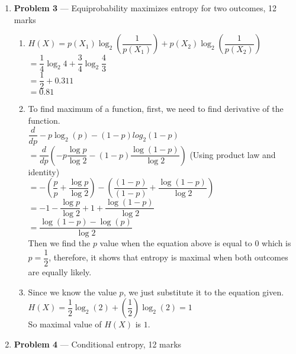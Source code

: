 \documentclass[11pt]{article}
\theoremstyle{definition}
\begin{document}
\begin{enumerate}
	
	\newpage
	\item[] \textbf{Problem 3} --- Equiprobability maximizes entropy for two outcomes, 12 marks
	
	
	\begin{enumerate}
		\item 
		$H(X) = p(X_{1}) \log_{2}(\dfrac{1}{p(X_{1})}) + p(X_{2})\log_{2}(\dfrac{1}{p(X_{2})})$\\
		$= \dfrac{1}{4} \log_{2} 4 + \dfrac{3}{4} \log_{2} \dfrac{4}{3}$\\
		$= \dfrac{1}{2} + 0.311$\\
		$= 0.81$
		\item To find maximum of a function, first, we need to find derivative of the function.\\
		$\dfrac{d}{dp} -p \log_{2}(p)-(1-p)log_{2}(1-p)$\\
		$ = \dfrac{d}{dp}(- p \dfrac{\log p}{\log 2} - (1-p)\dfrac{\log (1-p)}{\log 2} )$ (Using product law and identity)\\
		$ = -(\dfrac{p}{p}+\dfrac{\log p}{\log 2}) - (\dfrac{(1-p)}{(1-p)} + \dfrac{\log (1-p)}{\log 2}) $\\
		$ = -1 - \dfrac{\log p}{\log 2} + 1 + \dfrac{\log (1-p)}{\log 2}$\\
		$ = \dfrac{\log(1-p)-\log(p)}{\log 2}$\\
		Then we find the $p$ value when the equation above is equal to $0$ which is $p=\dfrac{1}{2}$, therefore, it shows that entropy is maximal when both outcomes are equally likely.
		
		
		
		\item  Since we know the value $p$, we just substitute it to the equation given.\\
		$H(X) = \dfrac{1}{2} \log_{2}(2) + (\dfrac{1}{2}) \log_{2}(2) = 1$\\
		So maximal value of $H(X)$ is $1$.	
	\end{enumerate}
	
	\newpage
	\item[] \textbf{Problem 4} --- Conditional entropy, 12 marks
		

\end{enumerate}
\end{document}
